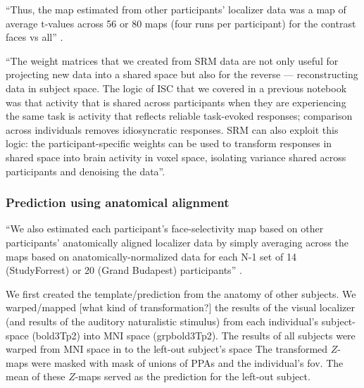 %
``Thus, the map estimated from other participants' localizer data was a map of
average t-values across 56 or 80 maps (four runs per participant) for the
contrast faces vs all'' \citep{jiahui2020predicting}.

``The weight matrices that we created from SRM data are not only useful for
projecting new data into a shared space but also for the reverse —
reconstructing data in subject space. The logic of ISC that we covered in a
previous notebook was that activity that is shared across participants when they
are experiencing the same task is activity that reflects reliable task-evoked
responses; comparison across individuals removes idiosyncratic responses. SRM
can also exploit this logic: the participant-specific weights can be used to
transform responses in shared space into brain activity in voxel space,
isolating variance shared across participants and denoising the data''.


\subsubsection{Prediction using anatomical alignment}



%
``We also estimated each participant's face-selectivity map based on other
participants' anatomically aligned localizer data by simply averaging across the
maps based on anatomically-normalized data for each N-1 set of 14 (StudyForrest)
or 20 (Grand Budapest) participants'' \citep{jiahui2020predicting}.

We first created the template/prediction from the anatomy of other subjects.
%
We warped/mapped [what kind of transformation?] the results of the visual
localizer (and results of the auditory naturalistic stimulus) from each
individual's subject-space (bold3Tp2) into MNI space (grpbold3Tp2).
The results of all subjects were warped from MNI space in to the left-out
subject's space
The transformed $Z$-maps were masked with mask of unions of PPAs and the
individual's \ac{fov}.
%
The mean of these $Z$-maps served as the prediction for the left-out subject.





